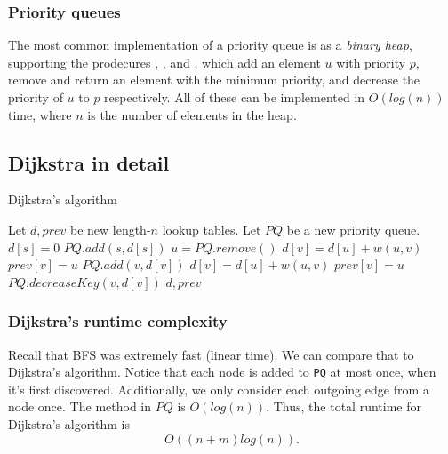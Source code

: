 \documentclass[titlepage, 12pt, leqno]{article}
\begin{document}
\subsubsection{Priority queues}
The most common implementation of a priority queue is as a \textit{binary heap},
supporting the prodecures , , and 
, which add an element $u$ with priority $p$, remove and
return an element with the minimum priority, and decrease the priority of $u$
to $p$ respectively. All of these can be implemented in $O(log(n))$ time, where
$n$ is the number of elements in the heap.

\subsection{Dijkstra in detail}
\begin{algorithm}
\caption{Dijkstra's algorithm}
\begin{algorithmic}[1]
    \State Let $d, prev$ be new length-$n$ lookup tables.
    \State Let $PQ$ be a new priority queue.
    \State $d[s] = 0$
    \State $PQ.add(s, d[s])$
        \State $u = PQ.remove()$
            \State $d[v] = d[u] + w(u,v)$
            \State $prev[v] = u$
            \State $PQ.add(v,d[v])$
        \EndIf
            \State $d[v] = d[u] + w(u,v)$
            \State $prev[v]=u$
            \State $PQ.decreaseKey(v,d[v])$
        \EndIf
        \EndFor
    \EndWhile
    \State \Return $d,prev$
\EndProcedure 
\end{algorithmic}
\end{algorithm}

\subsubsection{Dijkstra's runtime complexity}

Recall that BFS was extremely fast (linear time). We can compare that to
Dijkstra's algorithm. Notice that each node is added to \texttt{PQ} at most
once, when it's first discovered. Additionally, we only consider each outgoing
edge from a node once. The  method in $PQ$ is $O(log(n))$.
Thus, the total runtime for Dijkstra's algorithm is
\[
    O((n+m)log(n)).
\]
\end{document}
